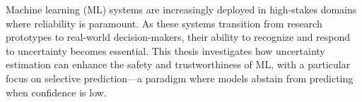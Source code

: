 



\noindent Machine learning (ML) systems are increasingly deployed in high-stakes domains where reliability is paramount. As these systems transition from research prototypes to real-world decision-makers, their ability to recognize and respond to uncertainty becomes essential. This thesis investigates how uncertainty estimation can enhance the safety and trustworthiness of ML, with a particular focus on selective prediction—a paradigm where models abstain from predicting when confidence is low.

